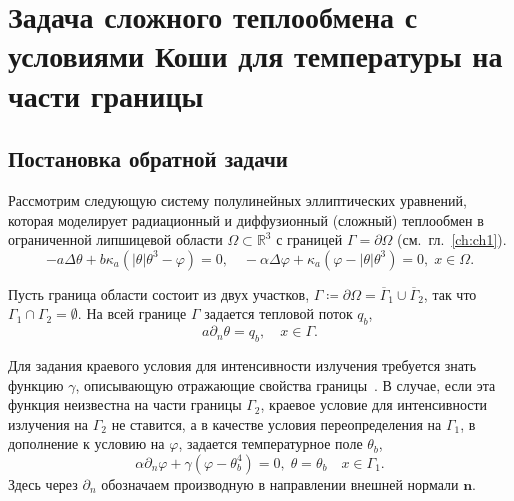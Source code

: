 \section{Задача сложного теплообмена с условиями Коши для температуры на части границы}
\label{sec:ch2/sec4}

\subsection{Постановка обратной задачи}\label{subsec:ch2/sec4/state}

Рассмотрим следующую систему полулинейных эллиптических уравнений, которая
моделирует радиационный и диффузионный (сложный) теплообмен в
ограниченной липшицевой области $\Omega\subset \mathbb{R}^3$ с границей
$\Gamma=\partial\Omega$ (см.\ гл.~\ref{ch:ch1}).
\begin{equation}
    \label{eq:2_4:eq1}
    - a\Delta\theta + b\kappa_a(|\theta|\theta^3- \varphi)=0,   \quad
    -\alpha \Delta \varphi + \kappa_a(\varphi-|\theta|\theta^3)=0,\; x\in\Omega.
\end{equation}

Пусть граница области состоит из двух участков,
$\Gamma \coloneqq \partial \Omega =\overline{\Gamma}_1 \cup \overline{\Gamma}_2$,
так что $\Gamma_1 \cap \Gamma_2 =  \emptyset$.
На всей границе $\Gamma$ задается тепловой поток $q_b$,
\begin{equation}
    \label{eq:2_4:bc1}
    a\partial_n\theta = q_b, \quad x\in \Gamma.
\end{equation}

Для задания краевого условия для интенсивности излучения
требуется знать функцию $\gamma$, описывающую отражающие свойства границы~\cite{JVM-14}.
В случае, если эта функция неизвестна на части границы $\Gamma_2$,
краевое условие для интенсивности излучения на $\Gamma_2$ не ставится, а в качестве условия
переопределения на $\Gamma_1$, в дополнение к условию на
$\varphi$, задается температурное поле $\theta_b$,
\begin{equation}
    \label{eq:2_4:bc2}
    \alpha\partial_n\varphi + \gamma (\varphi - \theta_b ^4 ) = 0,\;
    \theta=\theta_b\quad x\in \Gamma_1.
\end{equation}
Здесь через $\partial_n$ обозначаем производную в направлении
внешней нормали $\mathbf n$.

